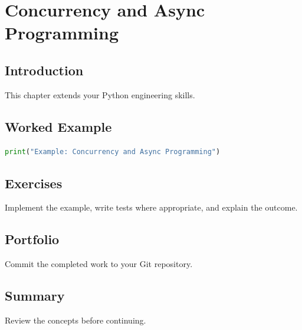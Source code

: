 \chapter{Concurrency and Async Programming}
\label{chap:vol3-25}



\section{Introduction}
This chapter extends your Python engineering skills.

\section{Worked Example}
\begin{lstlisting}[language=Python]
print("Example: Concurrency and Async Programming")
\end{lstlisting}

\section{Exercises}
\begin{exercise}
Implement the example, write tests where appropriate, and explain the outcome.
\end{exercise}

\section{Portfolio}
Commit the completed work to your Git repository.

\section{Summary}
Review the concepts before continuing.
